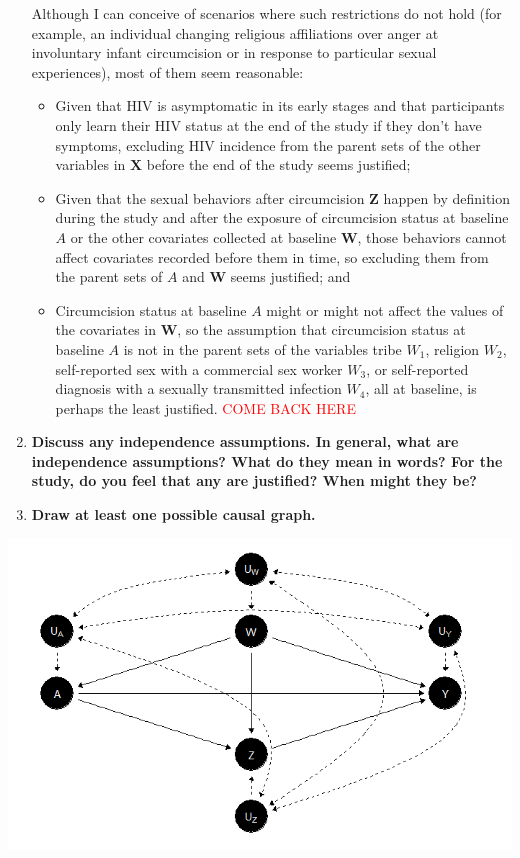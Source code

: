 \documentclass{article}
\begin{document}
\begin{enumerate}[label=\textbf{(\alph*)}]
  Although I can conceive of scenarios where such restrictions do not hold (for example, an individual changing religious affiliations over anger at involuntary infant circumcision or in response to particular sexual experiences), most of them seem reasonable:
    \begin{itemize}
      \item Given that HIV is asymptomatic in its early stages and that participants only learn their HIV status at the end of the study if they don't have symptoms, excluding HIV incidence from the parent sets of the other variables in $\bm{X}$ before the end of the study seems justified;
      \item Given that the sexual behaviors after circumcision $\bm{Z}$ happen by definition during the study and after the exposure of circumcision status at baseline $A$ or the other covariates collected at baseline $\bm{W}$, those behaviors cannot affect covariates recorded before them in time, so excluding them from the parent sets of $A$ and $\bm{W}$ seems justified; and
      \item Circumcision status at baseline $A$ might or might not affect the values of the covariates in $\bm{W}$, so the assumption that circumcision status at baseline $A$ is not in the parent sets of the variables tribe $W_1$, religion $W_2$, self-reported sex with a commercial sex worker $W_3$, or self-reported diagnosis with a sexually transmitted infection $W_4$, all at baseline, is perhaps the least justified.  \textcolor{red}{COME BACK HERE}
  \end{itemize}
  
  
  
  \item \textbf{Discuss any independence assumptions. In general, what are independence assumptions? What do they mean in words? For the study, do you feel that any are justified? When might they be?}
  
  \item \textbf{Draw at least one possible causal graph.}
  
\end{enumerate}

\includegraphics[scale=1]{dag_one.png}
\end{document}
